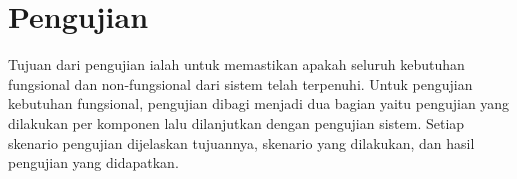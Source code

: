 \section{Pengujian}
\label{sec:pengujian}


Tujuan dari pengujian ialah untuk memastikan apakah seluruh kebutuhan fungsional dan non-fungsional dari sistem telah terpenuhi.
Untuk pengujian kebutuhan fungsional, pengujian dibagi menjadi dua bagian yaitu pengujian yang dilakukan per komponen lalu dilanjutkan dengan pengujian sistem. Setiap skenario pengujian dijelaskan tujuannya, skenario yang dilakukan, dan hasil pengujian yang didapatkan.











